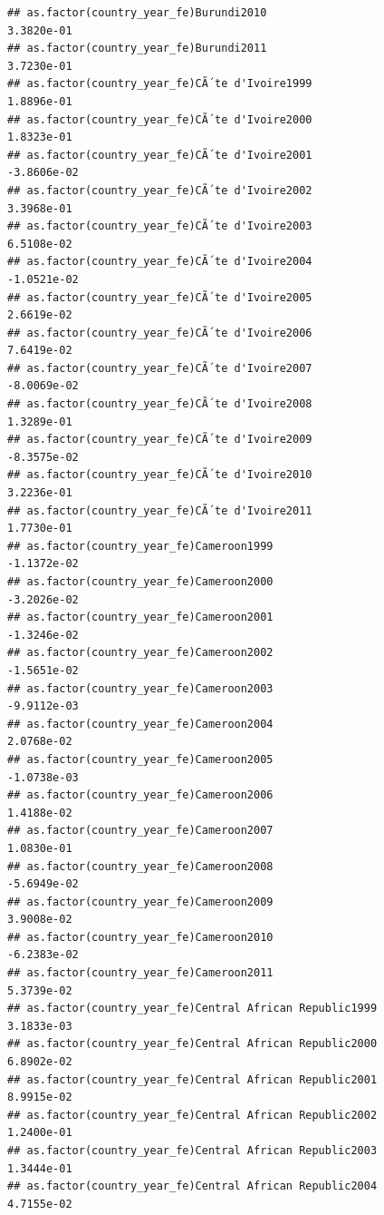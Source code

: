 \documentclass[
  a4paper,
]{article}
\begin{document}
\begin{verbatim}
## as.factor(country_year_fe)Burundi2010                           3.3820e-01
## as.factor(country_year_fe)Burundi2011                           3.7230e-01
## as.factor(country_year_fe)CÃ´te d'Ivoire1999                    1.8896e-01
## as.factor(country_year_fe)CÃ´te d'Ivoire2000                    1.8323e-01
## as.factor(country_year_fe)CÃ´te d'Ivoire2001                   -3.8606e-02
## as.factor(country_year_fe)CÃ´te d'Ivoire2002                    3.3968e-01
## as.factor(country_year_fe)CÃ´te d'Ivoire2003                    6.5108e-02
## as.factor(country_year_fe)CÃ´te d'Ivoire2004                   -1.0521e-02
## as.factor(country_year_fe)CÃ´te d'Ivoire2005                    2.6619e-02
## as.factor(country_year_fe)CÃ´te d'Ivoire2006                    7.6419e-02
## as.factor(country_year_fe)CÃ´te d'Ivoire2007                   -8.0069e-02
## as.factor(country_year_fe)CÃ´te d'Ivoire2008                    1.3289e-01
## as.factor(country_year_fe)CÃ´te d'Ivoire2009                   -8.3575e-02
## as.factor(country_year_fe)CÃ´te d'Ivoire2010                    3.2236e-01
## as.factor(country_year_fe)CÃ´te d'Ivoire2011                    1.7730e-01
## as.factor(country_year_fe)Cameroon1999                         -1.1372e-02
## as.factor(country_year_fe)Cameroon2000                         -3.2026e-02
## as.factor(country_year_fe)Cameroon2001                         -1.3246e-02
## as.factor(country_year_fe)Cameroon2002                         -1.5651e-02
## as.factor(country_year_fe)Cameroon2003                         -9.9112e-03
## as.factor(country_year_fe)Cameroon2004                          2.0768e-02
## as.factor(country_year_fe)Cameroon2005                         -1.0738e-03
## as.factor(country_year_fe)Cameroon2006                          1.4188e-02
## as.factor(country_year_fe)Cameroon2007                          1.0830e-01
## as.factor(country_year_fe)Cameroon2008                         -5.6949e-02
## as.factor(country_year_fe)Cameroon2009                          3.9008e-02
## as.factor(country_year_fe)Cameroon2010                         -6.2383e-02
## as.factor(country_year_fe)Cameroon2011                          5.3739e-02
## as.factor(country_year_fe)Central African Republic1999          3.1833e-03
## as.factor(country_year_fe)Central African Republic2000          6.8902e-02
## as.factor(country_year_fe)Central African Republic2001          8.9915e-02
## as.factor(country_year_fe)Central African Republic2002          1.2400e-01
## as.factor(country_year_fe)Central African Republic2003          1.3444e-01
## as.factor(country_year_fe)Central African Republic2004          4.7155e-02

\end{verbatim}
\end{document}
